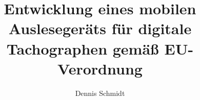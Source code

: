 \documentclass{fiwthesis}
\title{Entwicklung eines mobilen Auslesegeräts für digitale Tachographen gemäß EU-Verordnung}
\author{Dennis Schmidt}
\begin{document}

\maketitle

%

\maketoc[compact]


















%




\begin{appendices}

\end{appendices}


\singlespacing

\listofreferences

\listoffigures

\listoftables

\listofacronyms

\listofsymbols


\printglossary

\printindex

\normalspacing


\makedeclarationofindependence
\end{document}

